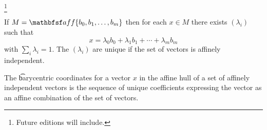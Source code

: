 
\footnote{Future editions will include.}


\begin{prop}
  If $M = \aff\set{b_0, b_1, \dots, b_m}$ then for each $x \in M$ there exists $(\lambda_i)$ such that
  $$
    x = \lambda_0 b_0 + \lambda_1 b_1 + \cdots + \lambda_m b_m
  $$
  with $\sum_{i} \lambda_i = 1$.
  The $(\lambda_i)$ are unique if the set of vectors is affinely independent.
\end{prop}

The \t{barycentric coordinates} for a vector $x$ in the affine hull of a set of affinely independent vectors is the sequence of unique coefficients expressing the vector as an affine combination of the set of vectors.

\blankpage
